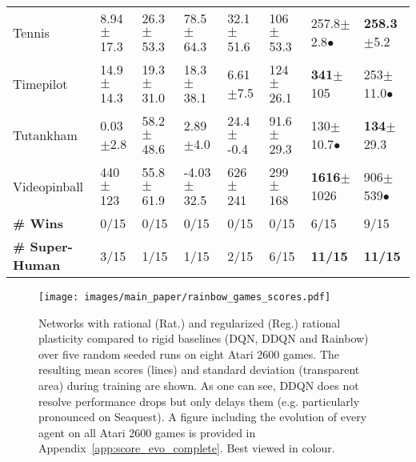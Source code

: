 \documentclass[accepted]{article}
\theoremstyle{plain}
\theoremstyle{definition}
\theoremstyle{remark}
\begin{document}
\begin{table*}[t]
\begin{tabular}{@{}llllllll@{}}
Tennis                           & 8.94\tiny$\pm$17.3        & 26.3\tiny$\pm$53.3                    & \multicolumn{1}{l|}{78.5\tiny$\pm$64.3}  & \multicolumn{1}{l|}{32.1\tiny$\pm$51.6}  & 106\tiny$\pm$53.3                     & 257.8\tiny$\pm$2.8\normalsize$\bullet$ & \textbf{258.3}\tiny$\pm$5.2             \\
Timepilot                        & 14.9\tiny$\pm$14.3        & 19.3\tiny$\pm$31.0                    & \multicolumn{1}{l|}{18.3\tiny$\pm$38.1}  & \multicolumn{1}{l|}{6.61\tiny$\pm$7.5}   & 124\tiny$\pm$26.1                     & \textbf{341}\tiny$\pm$105              & 253\tiny$\pm$11.0\normalsize$\bullet$   \\
Tutankham                        & 0.03\tiny$\pm$2.8         & 58.2\tiny$\pm$48.6                    & \multicolumn{1}{l|}{2.89\tiny$\pm$4.0}   & \multicolumn{1}{l|}{24.4\tiny$\pm$-0.4}  & 91.6\tiny$\pm$29.3                    & 130\tiny$\pm$10.7\normalsize$\bullet$  & \textbf{134}\tiny$\pm$29.3              \\
Videopinball                     & 440\tiny$\pm$123          & 55.8\tiny$\pm$61.9                    & \multicolumn{1}{l|}{-4.03\tiny$\pm$32.5} & \multicolumn{1}{l|}{626\tiny$\pm$241}    & 299\tiny$\pm$168                      & \textbf{1616}\tiny$\pm$1026            & 906\tiny$\pm$539\normalsize$\bullet$    \\ \midrule
\textbf{\# Wins}                 & 0/15                      & 0/15                                  & \multicolumn{1}{l|}{0/15}                & \multicolumn{1}{l|}{0/15}                & 0/15                                  & 6/15                                   & 9/15                                    \\
\textbf{\# Super-Human}          & 3/15                      & 1/15                                  & 1/15                                     & 2/15                                     & 6/15                                  & \textbf{11/15}                         & \textbf{11/15}                          \\ \bottomrule
\end{tabular}

\end{table*}

\begin{figure*}[t]
\centering
\texttt{[image: images/main\_paper/rainbow\_games\_scores.pdf]} \vspace{-0.33 cm}
\caption{Networks with rational (Rat.) and regularized (Reg.) rational plasticity compared to rigid baselines (DQN, DDQN and Rainbow) over five random seeded runs on eight Atari 2600 games. The resulting mean scores (lines) and standard deviation (transparent area) during training are shown.
As one can see, DDQN does not resolve performance drops but only delays them (e.g. particularly pronounced on Seaquest). 
A figure including the evolution of every agent on all Atari 2600 games is provided in Appendix~\ref{app:score_evo_complete}. Best viewed in colour.}
\label{fig:raibow_scores_evo}
\end{figure*}
\end{document}
